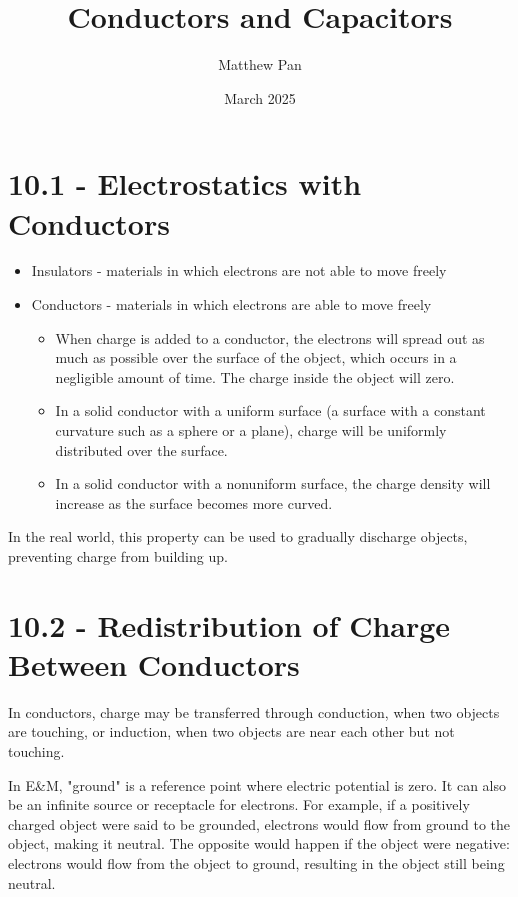 \documentclass[12pt, titlepage]{article}
\title{Conductors and Capacitors}
\author{Matthew Pan}
\date{March 2025}
\begin{document}
\pagestyle{fancy}

\fancyhead{}
\fancyhead[R]{\thepage}

\maketitle

\section*{10.1 - Electrostatics with Conductors}

\begin{itemize}
    \item Insulators - materials in which electrons are not able to move freely 
    \item Conductors - materials in which electrons are able to move freely
    \begin{itemize}
        \item When charge is added to a conductor, the electrons will spread out as much as possible over the surface of the object, which occurs in a negligible amount of time. The charge inside the object will zero.
        \item In a solid conductor with a uniform surface (a surface with a constant curvature such as a sphere or a plane), charge will be uniformly distributed over the surface.
        \item In a solid conductor with a nonuniform surface, the charge density will increase as the surface becomes more curved.
    \end{itemize}
\end{itemize}

In the real world, this property can be used to gradually discharge objects, preventing charge from building up. 

\section*{10.2 - Redistribution of Charge Between Conductors}

In conductors, charge may be transferred through conduction, when two objects are touching, or induction, when two objects are near each other but not touching. 

In E\&M, "ground" is a reference point where electric potential is zero. It can also be an infinite source or receptacle for electrons. For example, if a positively charged object were said to be grounded, electrons would flow from ground to the object, making it neutral. The opposite would happen if the object were negative: electrons would flow from the object to ground, resulting in the object still being neutral.  
\end{document}

